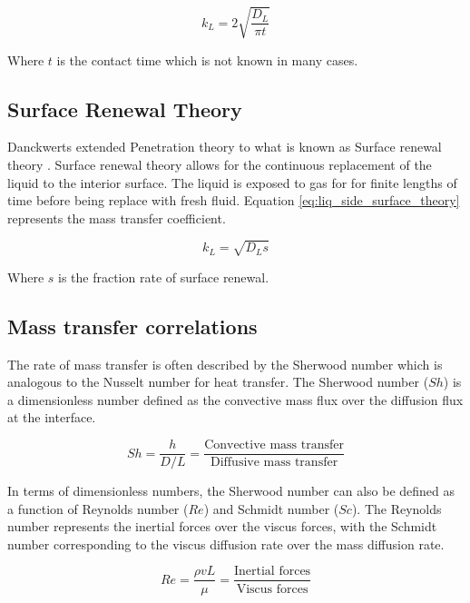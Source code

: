 \begin{equation}
	k_{L} = 2 \sqrt{\frac{D_{L}}{\pi t}}
	\label{eq:liq_side_penetration_theory}
\end{equation}

Where $t$ is the contact time which is not known in many cases.

\subsection{Surface Renewal Theory}
Danckwerts extended Penetration theory to what is known as Surface renewal theory \cite{perry2007}. Surface renewal theory allows for the continuous replacement of the liquid to the interior surface. The liquid is exposed to gas for for finite lengths of time before being replace with fresh fluid. Equation \ref{eq:liq_side_surface_theory} represents the mass transfer coefficient. 

\begin{equation}
	k_{L} = \sqrt{D_{L} s}
	\label{eq:liq_side_surface_theory}
\end{equation}

Where $s$ is the fraction rate of surface renewal. 

\subsection{Mass transfer correlations}
The rate of mass transfer is often described by the Sherwood number which is analogous to the Nusselt number for heat transfer. The Sherwood number ($Sh$) is a dimensionless number defined as the convective mass flux over the diffusion flux at the interface. 

\begin{equation}
	Sh = \frac{h}{D/L} = \frac{\text{Convective mass transfer}}{\text{Diffusive mass transfer}}
	\label{eq:sherwood_number}
\end{equation}

In terms of dimensionless numbers, the Sherwood number can also be defined as a function of Reynolds number ($Re$) and Schmidt number ($Sc$). The Reynolds number represents the inertial forces over the viscus forces, with the Schmidt number corresponding to the viscus diffusion rate over the mass diffusion rate. 

\begin{equation}
	Re = \frac{\rho v L}{\mu} = \frac{\text{Inertial forces}}{\text{Viscus forces}}
	\label{eq:reynolds_number}
\end{equation}

